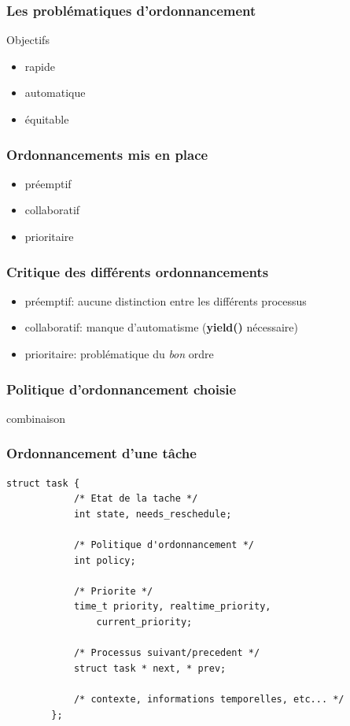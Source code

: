 \documentclass{beamer}
\begin{document}
\begin{frame}
    \frametitle{Les problématiques d'ordonnancement}
    \begin{center}
        \huge Objectifs
    \end{center}
    \begin{itemize}
        \item<2-> rapide
        \item<3-> automatique
        \item<4-> équitable
    \end{itemize}
\end{frame}

\begin{frame}
    \frametitle{Ordonnancements mis en place}
    \begin{itemize}
        \item<2-> préemptif
        \item<3-> collaboratif
        \item<4-> prioritaire
    \end{itemize}
\end{frame}

\begin{frame}
    \frametitle{Critique des différents ordonnancements}
    \begin{itemize}
        \item préemptif: aucune distinction entre les différents processus
        \item collaboratif: manque d'automatisme (\textbf{yield()} nécessaire)
        \item prioritaire: problématique du \emph{bon} ordre
    \end{itemize}
\end{frame}

\begin{frame}
    \frametitle{Politique d'ordonnancement choisie}
    \begin{center}
        \huge combinaison
    \end{center}
\end{frame}

\begin{frame}[fragile]
    \frametitle{Ordonnancement d'une tâche}
    \begin{lstlisting}[caption=Représentation structurelle d'un processus]
        struct task {
            /* Etat de la tache */
            int state, needs_reschedule;

            /* Politique d'ordonnancement */
            int policy;

            /* Priorite */
            time_t priority, realtime_priority,
                current_priority;

            /* Processus suivant/precedent */
            struct task * next, * prev;

            /* contexte, informations temporelles, etc... */
        };
    \end{lstlisting}
\end{frame}
\end{document}
